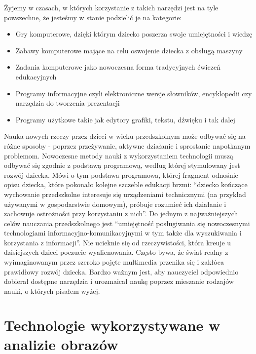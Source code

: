 \documentclass{article}
\begin{document}
\par
Żyjemy w czasach, w których korzystanie z takich narzędzi jest na tyle powszechne, że jesteśmy w stanie podzielić je na kategorie\cite{ref8}:
\newline
\begin{itemize}
	\item Gry komputerowe, dzięki którym dziecko poszerza swoje umiejętności i wiedzę
	\item Zabawy komputerowe mające na celu oswojenie dziecka z obsługą maszyny
	\item Zadania komputerowe jako nowoczesna forma tradycyjnych ćwiczeń edukacyjnych
	\item Programy informacyjne czyli elektroniczne wersje słowników, encyklopedii czy narzędzia do tworzenia prezentacji
	\item Programy użytkowe takie jak edytory grafiki, tekstu, dźwięku i tak dalej
\end{itemize}
\par
Nauka nowych rzeczy przez dzieci w wieku przedszkolnym może odbywać się na różne sposoby - poprzez przeżywanie, aktywne działanie i sprostanie napotkanym problemom. Nowoczesne metody nauki z wykorzystaniem technologii muszą odbywać się zgodnie z podstawą programową, według której stymulowany jest rozwój dziecka. Mówi o tym podstawa programowa, której fragment odnośnie opisu dziecka, które pokonało kolejne szczeble edukacji brzmi: “dziecko kończące wychowanie przedszkolne interesuje się urządzeniami technicznymi (na przykład używanymi w gospodarstwie domowym), próbuje rozumieć ich działanie i zachowuje ostrożności przy korzystaniu z nich”\cite{ref9}. Do jednym z najważniejszych celów nauczania przedszkolnego jest “umiejętność posługiwania się nowoczesnymi technologiami informacyjno-komunikacyjnymi w tym także dla wyszukiwania i korzystania z informacji”. Nie ucieknie się od rzeczywistości, która kreuje u dzisiejszych dzieci poczucie wyalienowania. Często bywa, że świat realny z wyimaginowanym przez szeroko pojęte multimedia przenika się i zakłóca prawidłowy rozwój dziecka. Bardzo ważnym jest, aby nauczyciel odpowiednio dobierał dostępne narzędzia i urozmaicał naukę poprzez mieszanie rodzajów nauki, o których pisałem wyżej.

\section{Technologie wykorzystywane w analizie obrazów}
\end{document}
